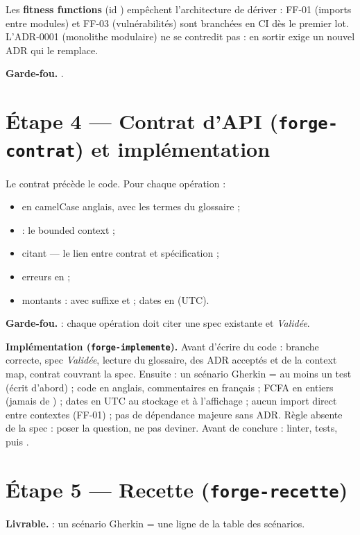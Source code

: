 Les \textbf{fitness functions} (id ) empêchent l'architecture de dériver : FF-01 (imports entre modules) et FF-03 (vulnérabilités) sont branchées en CI dès le premier lot. L'ADR-0001 (monolithe modulaire) ne se contredit pas : en sortir exige un nouvel ADR qui le remplace.

\textbf{Garde-fou.} .

\section{Étape 4 --- Contrat d'API (\texttt{forge-contrat}) et implémentation}
Le contrat  précède le code. Pour chaque opération :
\begin{itemize}
  \item {} en camelCase anglais, avec les termes du glossaire ;
  \item {} : le bounded context ;
  \item {} citant  --- le lien entre contrat et spécification ;
  \item erreurs en  ;
  \item montants :  avec suffixe  et  ; dates en  (UTC).
\end{itemize}
\textbf{Garde-fou.}  : chaque opération doit citer une spec existante et \emph{Validée}.

\medskip
\textbf{Implémentation (\texttt{forge-implemente}).} Avant d'écrire du code : branche correcte, spec \emph{Validée}, lecture du glossaire, des ADR acceptés et de la context map, contrat couvrant la spec. Ensuite : un scénario Gherkin = au moins un test (écrit d'abord) ; code en anglais, commentaires en français ; FCFA en entiers (jamais de ) ; dates en UTC au stockage et  à l'affichage ; aucun import direct entre contextes (FF-01) ; pas de dépendance majeure sans ADR. Règle absente de la spec : poser la question, ne pas deviner. Avant de conclure : linter, tests, puis .

\section{Étape 5 --- Recette (\texttt{forge-recette})}
\textbf{Livrable.}  : un scénario Gherkin = une ligne de la table des scénarios.

